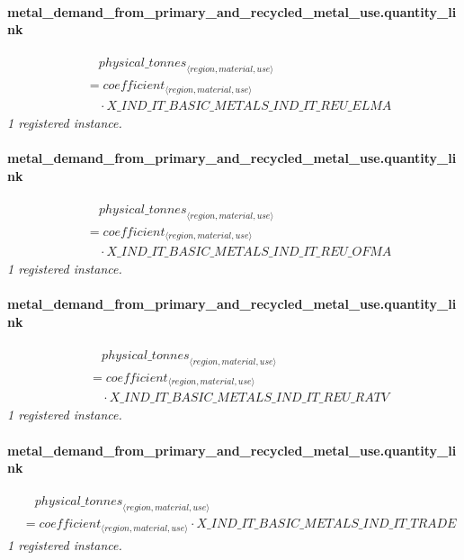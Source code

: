 \documentclass[11pt]{article}
\begin{document}
\paragraph{metal\_demand\_from\_primary\_and\_recycled\_metal\_use.quantity\_link}
\begin{align*}
&\quad {physical\_tonnes}_{\langle region, material, use\rangle}\\
&= coefficient_{\langle region, material, use\rangle}\\
&\quad {}\cdot X\_IND\_IT\_BASIC\_METALS\_IND\_IT\_REU\_ELMA
\end{align*}
\noindent\emph{1 registered instance.}\par
\paragraph{metal\_demand\_from\_primary\_and\_recycled\_metal\_use.quantity\_link}
\begin{align*}
&\quad {physical\_tonnes}_{\langle region, material, use\rangle}\\
&= coefficient_{\langle region, material, use\rangle}\\
&\quad {}\cdot X\_IND\_IT\_BASIC\_METALS\_IND\_IT\_REU\_OFMA
\end{align*}
\noindent\emph{1 registered instance.}\par
\paragraph{metal\_demand\_from\_primary\_and\_recycled\_metal\_use.quantity\_link}
\begin{align*}
&\quad {physical\_tonnes}_{\langle region, material, use\rangle}\\
&= coefficient_{\langle region, material, use\rangle}\\
&\quad {}\cdot X\_IND\_IT\_BASIC\_METALS\_IND\_IT\_REU\_RATV
\end{align*}
\noindent\emph{1 registered instance.}\par
\paragraph{metal\_demand\_from\_primary\_and\_recycled\_metal\_use.quantity\_link}
\begin{align*}
&\quad {physical\_tonnes}_{\langle region, material, use\rangle}\\
&= coefficient_{\langle region, material, use\rangle} \cdot X\_IND\_IT\_BASIC\_METALS\_IND\_IT\_TRADE
\end{align*}
\noindent\emph{1 registered instance.}\par
\end{document}
